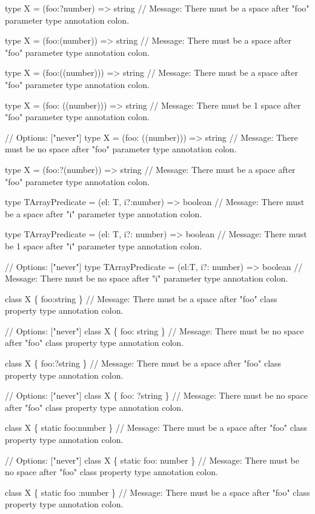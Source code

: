 \begin{DoxyCode}
type X = (foo:?number) => string
// Message: There must be a space after "foo" parameter type annotation colon.

type X = (foo:(number)) => string
// Message: There must be a space after "foo" parameter type annotation colon.

type X = (foo:((number))) => string
// Message: There must be a space after "foo" parameter type annotation colon.

type X = (foo:  ((number))) => string
// Message: There must be 1 space after "foo" parameter type annotation colon.

// Options: ["never"]
type X = (foo: ((number))) => string
// Message: There must be no space after "foo" parameter type annotation colon.

type X = (foo:?(number)) => string
// Message: There must be a space after "foo" parameter type annotation colon.

type TArrayPredicate = (el: T, i?:number) => boolean
// Message: There must be a space after "i" parameter type annotation colon.

type TArrayPredicate = (el: T, i?:  number) => boolean
// Message: There must be 1 space after "i" parameter type annotation colon.

// Options: ["never"]
type TArrayPredicate = (el:T, i?: number) => boolean
// Message: There must be no space after "i" parameter type annotation colon.

class X \{ foo:string \}
// Message: There must be a space after "foo" class property type annotation colon.

// Options: ["never"]
class X \{ foo: string \}
// Message: There must be no space after "foo" class property type annotation colon.

class X \{ foo:?string \}
// Message: There must be a space after "foo" class property type annotation colon.

// Options: ["never"]
class X \{ foo: ?string \}
// Message: There must be no space after "foo" class property type annotation colon.

class X \{ static foo:number \}
// Message: There must be a space after "foo" class property type annotation colon.

// Options: ["never"]
class X \{ static foo: number \}
// Message: There must be no space after "foo" class property type annotation colon.

class X \{ static foo :number \}
// Message: There must be a space after "foo" class property type annotation colon.


\end{DoxyCode}
